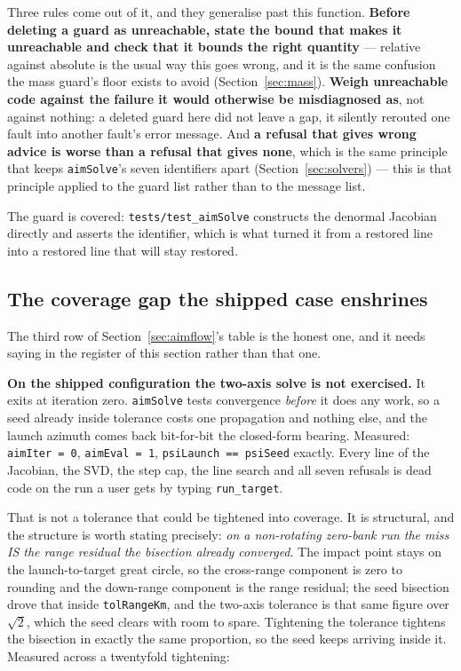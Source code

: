 \documentclass[11pt]{article}
\newcommand{\code}[1]{\texttt{#1}}
\begin{document}
Three rules come out of it, and they generalise past this function.
\textbf{Before deleting a guard as unreachable, state the bound that makes it
unreachable and check that it bounds the right quantity} --- relative against
absolute is the usual way this goes wrong, and it is the same confusion the
mass guard's floor exists to avoid (Section~\ref{sec:mass}). \textbf{Weigh
unreachable code against the failure it would otherwise be misdiagnosed as},
not against nothing: a deleted guard here did not leave a gap, it silently
rerouted one fault into another fault's error message. And \textbf{a refusal
that gives wrong advice is worse than a refusal that gives none}, which is the
same principle that keeps \code{aimSolve}'s seven identifiers apart
(Section~\ref{sec:solvers}) --- this is that principle applied to the guard
list rather than to the message list.

The guard is covered: \code{tests/test\_aimSolve} constructs the denormal
Jacobian directly and asserts the identifier, which is what turned it from a
restored line into a restored line that will stay restored.

\subsection{The coverage gap the shipped case enshrines}
\label{sec:aimcoverage}

The third row of Section~\ref{sec:aimflow}'s table is the honest one, and it
needs saying in the register of this section rather than that one.

\textbf{On the shipped configuration the two-axis solve is not exercised.} It
exits at iteration zero. \code{aimSolve} tests convergence \emph{before} it
does any work, so a seed already inside tolerance costs one propagation and
nothing else, and the launch azimuth comes back bit-for-bit the closed-form
bearing. Measured: \code{aimIter = 0}, \code{aimEval = 1},
\code{psiLaunch == psiSeed} exactly. Every line of the Jacobian, the SVD, the
step cap, the line search and all seven refusals is dead code on the run a user
gets by typing \code{run\_target}.

That is not a tolerance that could be tightened into coverage. It is
structural, and the structure is worth stating precisely: \emph{on a
non-rotating zero-bank run the miss IS the range residual the bisection
already converged}. The impact point stays on the launch-to-target great
circle, so the cross-range component is zero to rounding and the down-range
component is the range residual; the seed bisection drove that inside
\code{tolRangeKm}, and the two-axis tolerance is that same figure over
$\sqrt2$, which the seed clears with room to spare. Tightening the tolerance
tightens the bisection in exactly the same proportion, so the seed keeps
arriving inside it. Measured across a twentyfold tightening:
\end{document}
